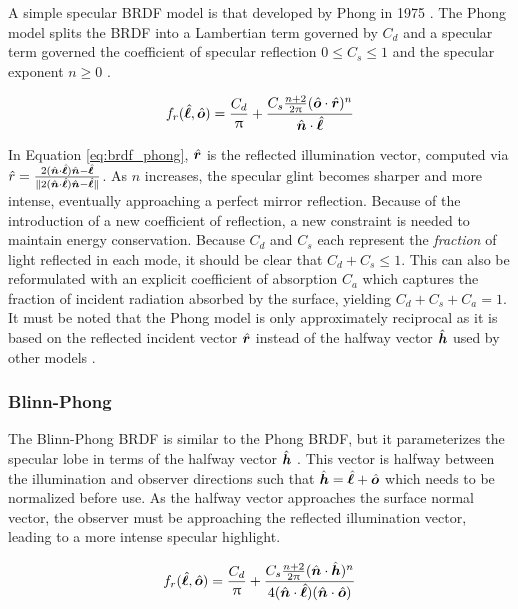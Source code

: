 A simple specular BRDF model is that developed by Phong in 1975 \cite{phong1975}. The Phong model splits the BRDF into a Lambertian term governed by $C_d$ and a specular term governed the coefficient of specular reflection $ 0 \leq C_s \leq 1$ and the specular exponent $n \geq 0$ \cite{duvenhage2013}. 

\begin{equation} \label{eq:brdf_phong}
  f_r(\hat{\bm{\ell}}, \hat{\bm{o}}) = \frac{C_d}{\uppi} + \frac{C_s \frac{n+2}{2\uppi} (\hat{\bm{o}} \cdot \hat{\bm{r}})^n}{\hat{\bm{n}} \cdot \hat{\bm{\ell}}}
\end{equation}

In Equation \ref{eq:brdf_phong}, $\hat{\bm{r}}$ is the reflected illumination vector, computed via $\hat{r} = \frac{2 (\hat{\bm{n}} \cdot \hat{\bm{\ell}}) \hat{\bm{n}} - \hat{\bm{\ell}}}{\| 2 (\hat{\bm{n}} \cdot \hat{\bm{\ell}}) \hat{\bm{n}} - \hat{\bm{\ell}} \|}$. As $n$ increases, the specular glint becomes sharper and more intense, eventually approaching a perfect mirror reflection. Because of the introduction of a new coefficient of reflection, a new constraint is needed to maintain energy conservation. Because $C_d$ and $C_s$ each represent the \textit{fraction} of light reflected in each mode, it should be clear that $C_d + C_s \leq 1$. This can also be reformulated with an explicit coefficient of absorption $C_a$ which captures the fraction of incident radiation absorbed by the surface, yielding $C_d + C_s + C_a = 1$. It must be noted that the Phong model is only approximately reciprocal as it is based on the reflected incident vector $\hat{\bm{r}}$ instead of the halfway vector $\hat{\bm{h}}$ used by other models \cite{duvenhage2013}.

\subsubsection{Blinn-Phong}

The Blinn-Phong BRDF is similar to the Phong BRDF, but it parameterizes the specular lobe in terms of the halfway vector $\hat{\bm{h}}$ \cite{duvenhage2013}. This vector is halfway between the illumination and observer directions such that $\hat{\bm{h}} = \hat{\bm{\ell}} + \hat{\bm{o}}$ which needs to be normalized before use. As the halfway vector approaches the surface normal vector, the observer must be approaching the reflected illumination vector, leading to a more intense specular highlight. 

\begin{equation} \label{eq:brdf_blinn_phong}
  f_r(\hat{\bm{\ell}}, \hat{\bm{o}}) = \frac{C_d}{\uppi} + \frac{C_s \frac{n+2}{2\uppi} (\hat{\bm{n}} \cdot \hat{\bm{h}})^n}{4 (\hat{\bm{n}} \cdot \hat{\bm{\ell}})(\hat{\bm{n}} \cdot \hat{\bm{o}})}
\end{equation}

